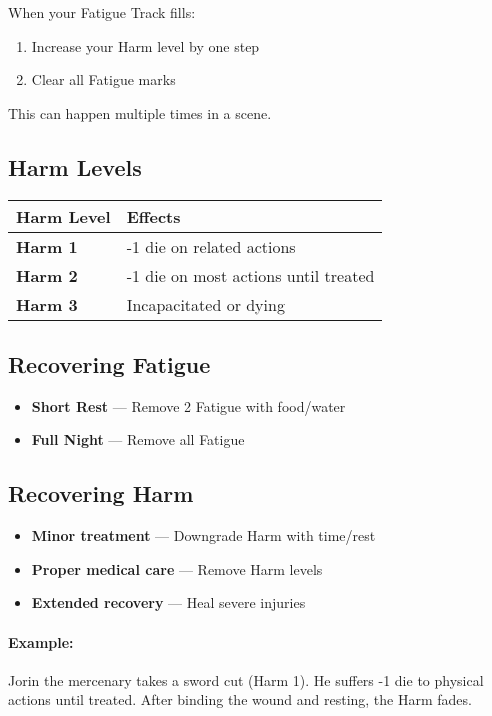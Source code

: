 When your Fatigue Track fills:
\begin{enumerate}
  \item Increase your Harm level by one step
  \item Clear all Fatigue marks
\end{enumerate}

This can happen multiple times in a scene.

\subsection*{Harm Levels}
\begin{center}
\small
\begin{tabular}{ll}
\toprule
\textbf{Harm Level} & \textbf{Effects} \\
\midrule
\textbf{Harm 1} & -1 die on related actions \\
\textbf{Harm 2} & -1 die on most actions until treated \\
\textbf{Harm 3} & Incapacitated or dying \\
\bottomrule
\end{tabular}
\end{center}

\subsection*{Recovering Fatigue}
\begin{itemize}
  \item \textbf{Short Rest} — Remove 2 Fatigue with food/water
  \item \textbf{Full Night} — Remove all Fatigue
\end{itemize}

\subsection*{Recovering Harm}
\begin{itemize}
  \item \textbf{Minor treatment} — Downgrade Harm with time/rest
  \item \textbf{Proper medical care} — Remove Harm levels
  \item \textbf{Extended recovery} — Heal severe injuries
\end{itemize}

\paragraph{Example:}  
Jorin the mercenary takes a sword cut (Harm 1). He suffers -1 die to physical actions until treated. After binding the wound and resting, the Harm fades.


